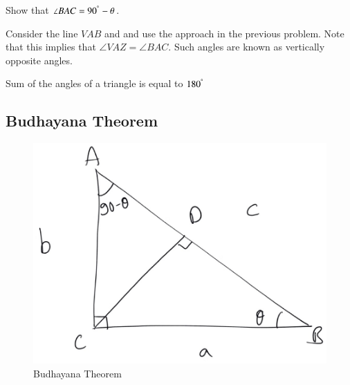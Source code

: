 \begin{problem}
	\label{ch1_compl_angle}
	Show that $\angle BAC = 90^{\degree} - \theta$.
\end{problem}	
	\proof Consider the line $VAB$ and and use the approach in the previous problem.  Note that this implies that $\angle VAZ = \angle BAC$.  Such angles are known as vertically opposite angles. 
	 
\begin{problem}
Sum of the angles of a triangle is equal to $180^{\degree}$
\end{problem}
\subsection{Budhayana Theorem}



\begin{figure}[!h]
	\begin{center}
		
		\includegraphics[width=\columnwidth]{./figs/ch1_budh_triangle}
		\vspace*{-10cm}
	\end{center}
	\caption{Budhayana Theorem}
	\label{ch1_budh_triangle}	
\end{figure}

